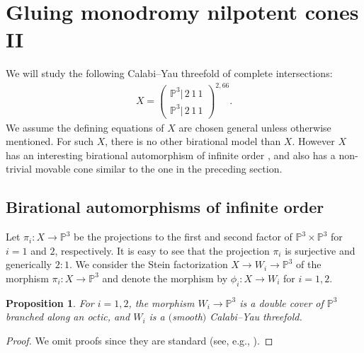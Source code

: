 \documentclass[pdftex]{sigma}
\numberwithin{equation}{section}
\newtheorem{Proposition}[Theorem]{Proposition}
\begin{document}
\section{Gluing monodromy nilpotent cones II}\label{section5}

We will study the following Calabi--Yau threefold of complete intersections:
\begin{gather*}
X=\left(\begin{smallmatrix}\mathbb{P}^{3}|\,2\,1\,1\\
\mathbb{P}^{3}|\,2\,1\,1
\end{smallmatrix}\right)^{2,66}.
\end{gather*}
We assume the defining equations of $X$ are chosen general unless otherwise mentioned. For such $X$, there is no other birational model than $X$. However $X$ has an interesting birational automorphism of infinite order \cite{Oguiso1}, and also has a non-trivial movable cone similar to the one in the preceding section.

\subsection{Birational automorphisms of infinite order}

Let $\pi_{i}\colon X\to\mathbb{P}^{3}$ be the projections to the first and second factor of $\mathbb{P}^{3}\times\mathbb{P}^{3}$ for $i=1$ and $2$, respectively. It is easy to see that the projection $\pi_{i}$ is surjective and generically $2:1$. We consider the Stein factorization $X\to W_{i}\to\mathbb{P}^{3}$ of the morphism $\pi_{i}\colon X\to\mathbb{P}^{3}$ and denote the morphism by $\phi_{i}\colon X\to W_{i}$ for $i=1,2$.
\begin{Proposition} For $i=1,2$, the morphism $W_{i}\to\mathbb{P}^{3}$ is a double cover of $\mathbb{P}^{3}$ branched along an octic, and $W_{i}$ is a $($smooth$)$ Calabi--Yau threefold. \end{Proposition}
\begin{proof} We omit proofs since they are standard (see, e.g., \cite{Oguiso1}).
\end{proof}
\end{document}
